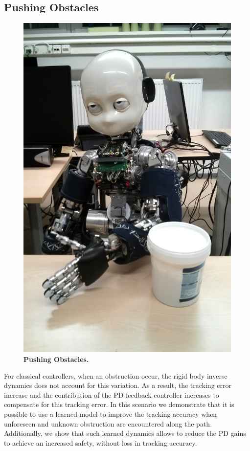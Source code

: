 \subsection{Pushing Obstacles}
    \begin{figure}
		\centering
		\includegraphics[width=.99\linewidth]{robertoIROS/fig/taskPush}
		\caption{\textbf{Pushing Obstacles. }}
		\label{fig:pushSetup}
    \end{figure}

    For classical controllers, when an obstruction occur, the rigid body inverse dynamics does not account for this variation. 
    As a result, the tracking error increase and the contribution of the PD feedback controller increases to compensate for this tracking error.
	In this scenario we demonstrate that it is possible to use a learned model to improve the tracking accuracy when unforeseen and unknown obstruction are encountered along the path.
    Additionally, we show that such learned dynamics allows to reduce the PD gains to achieve an increased safety, without loss in tracking accuracy.
	
